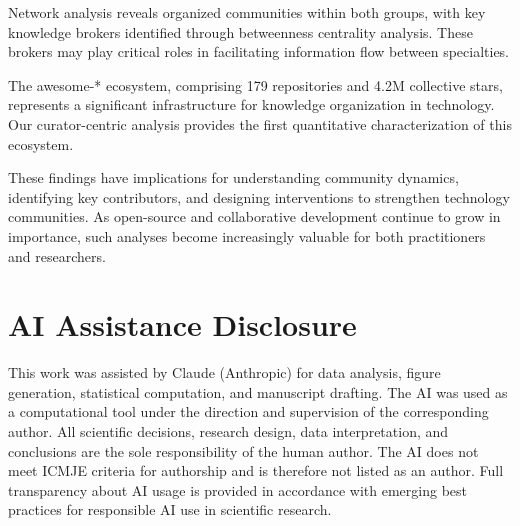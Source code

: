 \documentclass[11pt]{article}
\begin{document}
Network analysis reveals organized communities within both groups, with key knowledge brokers identified through betweenness centrality analysis. These brokers may play critical roles in facilitating information flow between specialties.

The awesome-* ecosystem, comprising 179 repositories and 4.2M collective stars, represents a significant infrastructure for knowledge organization in technology. Our curator-centric analysis provides the first quantitative characterization of this ecosystem.

These findings have implications for understanding community dynamics, identifying key contributors, and designing interventions to strengthen technology communities. As open-source and collaborative development continue to grow in importance, such analyses become increasingly valuable for both practitioners and researchers.


\section*{AI Assistance Disclosure}

This work was assisted by Claude (Anthropic) for data analysis, figure generation, statistical computation, and manuscript drafting. The AI was used as a computational tool under the direction and supervision of the corresponding author. All scientific decisions, research design, data interpretation, and conclusions are the sole responsibility of the human author. The AI does not meet ICMJE criteria for authorship and is therefore not listed as an author. Full transparency about AI usage is provided in accordance with emerging best practices for responsible AI use in scientific research.

\end{document}
